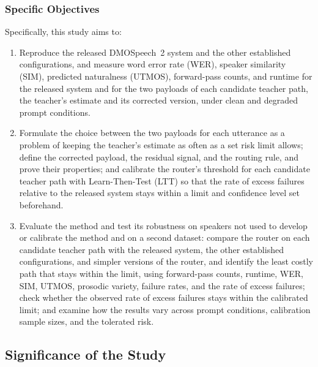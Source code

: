 \subsubsection{Specific Objectives}
Specifically, this study aims to:
\begin{enumerate}[leftmargin=1.4em]
\item Reproduce the released DMOSpeech~2 system and the other established configurations, and measure word error rate (WER), speaker similarity (SIM), predicted naturalness (UTMOS), forward-pass counts, and runtime for the released system and for the two payloads of each candidate teacher path, the teacher's estimate and its corrected version, under clean and degraded prompt conditions.
\item Formulate the choice between the two payloads for each utterance as a problem of keeping the teacher's estimate as often as a set risk limit allows; define the corrected payload, the residual signal, and the routing rule, and prove their properties; and calibrate the router's threshold for each candidate teacher path with Learn-Then-Test (LTT) so that the rate of excess failures relative to the released system stays within a limit and confidence level set beforehand.
\item Evaluate the method and test its robustness on speakers not used to develop or calibrate the method and on a second dataset: compare the router on each candidate teacher path with the released system, the other established configurations, and simpler versions of the router, and identify the least costly path that stays within the limit, using forward-pass counts, runtime, WER, SIM, UTMOS, prosodic variety, failure rates, and the rate of excess failures; check whether the observed rate of excess failures stays within the calibrated limit; and examine how the results vary across prompt conditions, calibration sample sizes, and the tolerated risk.
\end{enumerate}

\subsection{Significance of the Study}
\label{sec:significance}


